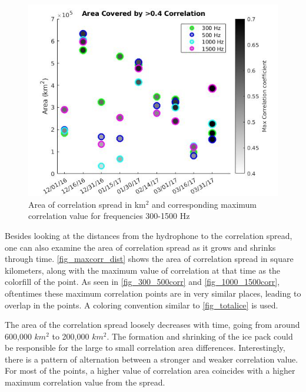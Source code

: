 \begin{figure}[p]
\centering
\includegraphics[scale=0.5]{Figures/area_cov_by_>0.4_noisland.jpg}
\caption{Area of correlation spread in km$^{2}$ and corresponding maximum correlation value for frequencies 300-1500 Hz}
\label{fig_maxcorr_dist}
\end{figure}


Besides looking at the distances from the hydrophone to the correlation spread, one can also examine the area of correlation spread as it grows and shrinks through time. \autoref{fig_maxcorr_dist} shows the area of correlation spread in square kilometers, along with the maximum value of correlation at that time as the colorfill of the point. As seen in \autoref{fig_300_500corr} and \autoref{fig_1000_1500corr}, oftentimes these maximum correlation points are in very similar places, leading to overlap in the points. A coloring convention similar to \autoref{fig_totalice} is used.

The area of the correlation spread loosely decreases with time, going from around 600,000 $km^{2}$ to 200,000 $km^{2}$. The formation and shrinking of the ice pack could be responsible for the large to small correlation area differences. Interestingly, there is a pattern of alternation between a stronger and weaker correlation value. For most of the points, a higher value of correlation area coincides with a higher maximum correlation value from the spread.

